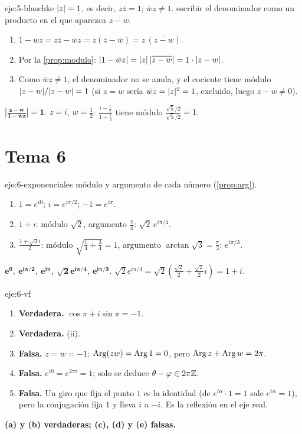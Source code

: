 \begin{solucion}{eje:5-blaschke}
\datos $\lvert z\rvert=1$, es decir, $z\bar z=1$; $\bar wz\ne1$.
\planteamiento escribir el denominador como un producto en el que aparezca $\overline{z-w}$.
\pasos
\begin{enumerate}[label=\arabic*.]
  \item $1-\bar wz=z\bar z-\bar wz=z(\bar z-\bar w)=z\,\overline{(z-w)}$.
  \item Por la \cref{prop:modulo}: $\lvert1-\bar wz\rvert=\lvert z\rvert\,\lvert\overline{z-w}\rvert=1\cdot\lvert z-w\rvert$.
  \item Como $\bar wz\ne1$, el denominador no se anula, y el cociente tiene módulo $\lvert z-w\rvert/\lvert z-w\rvert=1$ (si $z=w$ sería $\bar wz=\lvert z\rvert^{2}=1$, excluido, luego $z-w\ne0$).
\end{enumerate}
\resultado $\mathbf{\left|\frac{z-w}{1-\bar wz}\right|=1}$.
\comprobacion $z=i$, $w=\frac12$: $\frac{i-\frac12}{1-\frac{i}{2}}$ tiene módulo $\frac{\sqrt{5}/2}{\sqrt{5}/2}=1$.
\end{solucion}

\section{Tema 6}

\begin{solucion}{eje:6-exponenciales}
\planteamiento módulo y argumento de cada número (\cref{prop:arg}).
\pasos
\begin{enumerate}[label=\arabic*.]
  \item $1=e^{i0}$; \quad $i=e^{i\pi/2}$; \quad $-1=e^{i\pi}$.
  \item $1+i$: módulo $\sqrt2$, argumento $\frac{\pi}{4}$: $\sqrt2\,e^{i\pi/4}$.
  \item $\frac{1+\sqrt3i}{2}$: módulo $\sqrt{\frac14+\frac34}=1$, argumento $\arctan\sqrt3=\frac{\pi}{3}$: $e^{i\pi/3}$.
\end{enumerate}
\resultado $\mathbf{e^{0},\ e^{i\pi/2},\ e^{i\pi},\ \sqrt2e^{i\pi/4},\ e^{i\pi/3}}$.
\comprobacion $\sqrt2e^{i\pi/4}=\sqrt2(\frac{\sqrt2}{2}+\frac{\sqrt2}{2}i)=1+i$.
\end{solucion}

\begin{solucion}{eje:6-vf}
\pasos
\begin{enumerate}[label=(\alph*)]
  \item \textbf{Verdadera.} $\cos\pi+i\sin\pi=-1$.
  \item \textbf{Verdadera.} (ii).
  \item \textbf{Falsa.} $z=w=-1$: $\operatorname{Arg}(zw)=\operatorname{Arg}1=0$, pero $\operatorname{Arg} z+\operatorname{Arg} w=2\pi$.
  \item \textbf{Falsa.} $e^{i0}=e^{2\pi i}=1$; solo se deduce $\theta-\varphi\in2\pi\mathbb{Z}$.
  \item \textbf{Falsa.} Un giro que fija el punto $1$ es la identidad (de $e^{i\alpha}\cdot1=1$ sale $e^{i\alpha}=1$), pero la conjugación fija $1$ y lleva $i$ a $-i$. Es la reflexión en el eje real.
\end{enumerate}
\resultado \textbf{(a) y (b) verdaderas; (c), (d) y (e) falsas.}
\end{solucion}

